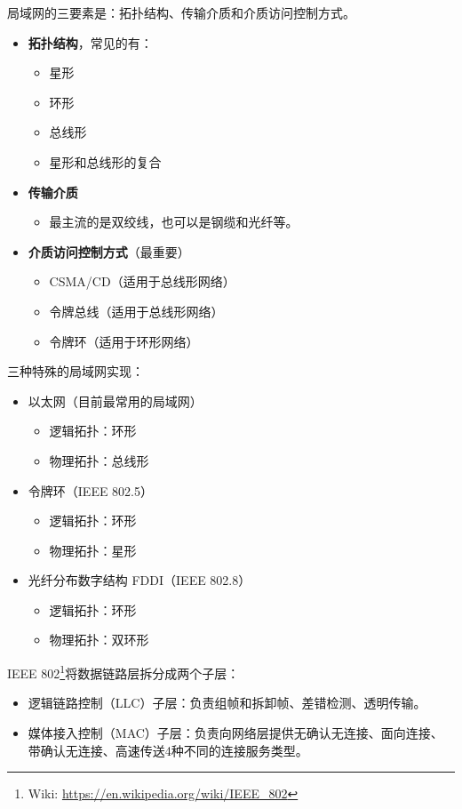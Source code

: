 \documentclass[12pt, a4paper, oneside]{ctexart}
\begin{document}
局域网的三要素是：拓扑结构、传输介质和介质访问控制方式。
\begin{itemize}
    \item {\bf 拓扑结构}，常见的有：
    \begin{itemize}
        \item 星形
        \item 环形
        \item 总线形
        \item 星形和总线形的复合
    \end{itemize}
    \item {\bf 传输介质}
    \begin{itemize}
        \item 最主流的是双绞线，也可以是钢缆和光纤等。
    \end{itemize}
    \item {\bf 介质访问控制方式}（最重要）
    \begin{itemize}
        \item CSMA/CD（适用于总线形网络）
        \item 令牌总线（适用于总线形网络）
        \item 令牌环（适用于环形网络）
    \end{itemize}
\end{itemize}

三种特殊的局域网实现：
\begin{itemize}
    \item 以太网（目前最常用的局域网）
    \begin{itemize}
        \item 逻辑拓扑：环形
        \item 物理拓扑：总线形
    \end{itemize}
    \item 令牌环（IEEE 802.5）
    \begin{itemize}
        \item 逻辑拓扑：环形
        \item 物理拓扑：星形
    \end{itemize}
    \item 光纤分布数字结构 FDDI（IEEE 802.8）
    \begin{itemize}
        \item 逻辑拓扑：环形
        \item 物理拓扑：双环形
    \end{itemize}
\end{itemize}

IEEE 802\footnote{Wiki: \href{https://en.wikipedia.org/wiki/IEEE\_802}{https://en.wikipedia.org/wiki/IEEE\_802}}将数据链路层拆分成两个子层：
\begin{itemize}
    \item 逻辑链路控制（LLC）子层：负责组帧和拆卸帧、差错检测、透明传输。
    \item 媒体接入控制（MAC）子层：负责向网络层提供无确认无连接、面向连接、带确认无连接、高速传送4种不同的连接服务类型。
\end{itemize}
\end{document}
